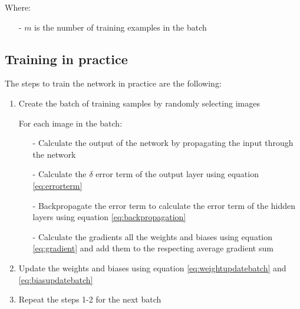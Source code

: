 \noindent
Where:

\begin{itemize}
    \item[-] $m$ is the number of training examples in the batch
\end{itemize}

\subsection{Training in practice}

\noindent
The steps to train the network in practice are the following:

\begin{enumerate}
    \item Create the batch of training samples by randomly selecting images
    
    For each image in the batch:
    
    \begin{itemize}
        \item[-] Calculate the output of the network by propagating the input through the network
        \item[-] Calculate the $\delta$ error term of the output layer using equation \ref{eq:errorterm}
        \item[-] Backpropagate the error term to calculate the error term of the hidden layers using equation 
        \ref{eq:backpropagation}
        \item[-] Calculate the gradients all the weights and biases using equation \ref{eq:gradient} and add them to the
        respecting average gradient sum
    \end{itemize}

    \item Update the weights and biases using equation \ref{eq:weightupdatebatch} and \ref{eq:biasupdatebatch}
    \item Repeat the steps 1-2 for the next batch
    
\end{enumerate}